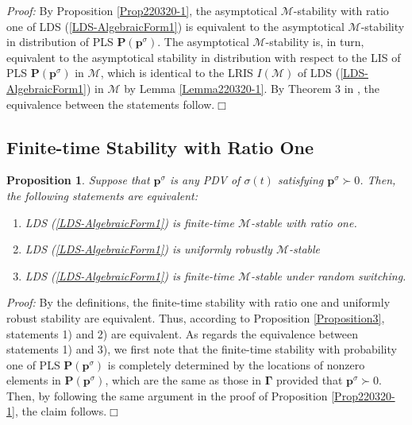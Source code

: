 \documentclass[11pt,onecolumn]{article}
\newtheorem{proposition}{Proposition}
\begin{document}
   {\it Proof:}  By Proposition \ref{Prop220320-1}, the asymptotical $\mathcal M$-stability with ratio one  of LDS (\ref{LDS-AlgebraicForm1}) is equivalent to the asymptotical $\mathcal M$-stability in distribution of PLS $\mathbf P(\boldsymbol p^\sigma)$. The asymptotical $\mathcal M$-stability  is, in turn, equivalent to the asymptotical stability in distribution with respect to the LIS of PLS $\mathbf P(\boldsymbol p^\sigma)$ in $\mathcal M$, which is identical to the LRIS $I(\mathcal M)$ of LDS (\ref{LDS-AlgebraicForm1}) in $\mathcal M$ by Lemma \ref{Lemma220320-1}. By Theorem 3 in \cite{Guo2019Stability}, the equivalence between the statements follow.\hfill$\Box$


\subsection{Finite-time Stability with Ratio One}

   \begin{proposition}\label{Prop220322-1}
Suppose that $\boldsymbol p^\sigma$ is any PDV of $\sigma(t)$ satisfying $\boldsymbol p^\sigma\succ0$. Then, the following statements are equivalent:
       \begin{enumerate}
         \item  LDS (\ref{LDS-AlgebraicForm1}) is finite-time $\mathcal M$-stable with ratio one.
         \item LDS (\ref{LDS-AlgebraicForm1}) is uniformly robustly  $\mathcal M$-stable
         \item LDS (\ref{LDS-AlgebraicForm1}) is finite-time $\mathcal M$-stable under random switching.
       \end{enumerate}
   \end{proposition}


   {\it Proof:}  By the definitions, the finite-time stability with ratio one and uniformly robust stability are equivalent. Thus, according to Proposition \ref{Proposition3}, statements 1) and 2) are equivalent. As regards the equivalence between statements 1) and 3), we first note that the finite-time stability with probability one of PLS $\mathbf P(\boldsymbol p^\sigma)$ is completely determined by the locations of nonzero elements in $\mathbf P(\boldsymbol p^\sigma)$, which are the same as those in $\boldsymbol\Gamma$ provided that $\boldsymbol p^\sigma\succ0$. Then, by following the same argument in the proof of Proposition \ref{Prop220320-1}, the claim follows.\hfill$\Box$
\end{document}

